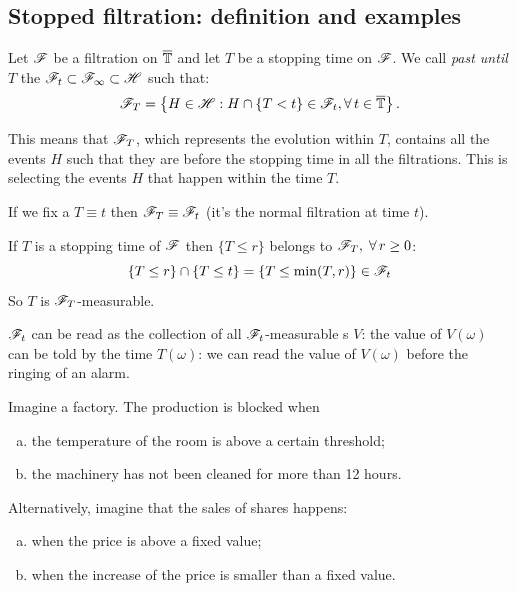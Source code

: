 \documentclass{report}
\begin{document}
\subsection{Stopped filtration: definition and examples}
\begin{definition}
	Let $\mathscr{F}$ be a filtration on $\overline{\mathbb{T}}$ and let $T$ be a stopping time on $\mathscr{F}$. We call \emph{past until $T$} the \sa{} $\mathscr{F}_t\subset\mathscr{F}_\infty\subset\mathscr{H}$ such that:
	\[\mathscr{F}_T=\left\{H\in\mathscr{H}:H\cap\{T<t\}\in\mathscr{F}_t,\forall\, t\in\overline{\mathbb{T}}\right\}.\]
\end{definition}
This means that $\mathscr{F}_T$, which represents the evolution within $T$, contains all the events $H$ such that they are before the stopping time in all the filtrations. This is selecting the events $H$ that happen within the time $T$.
\begin{remark}
	If we fix a $T\equiv t$ then $\mathscr{F}_T\equiv\mathscr{F}_t$ (it's the normal filtration at time $t$).
\end{remark}
If $T$ is a stopping time of $\mathscr{F}$ then $\{T\leq r\}$ belongs to $\mathscr{F}_T,\;\forall\, r\geq 0$:
\[\{T\leq r\}\cap\{T\leq t\}=\{T\leq\min(T,r)\}\in\mathscr{F}_t\]
So $T$ is $\mathscr{F}_T$-measurable. 
\begin{remark}
	$\mathscr{F}_t$ can be read as the collection of all $\mathscr{F}_t$-measurable \rv{}s $V$: the value of $V(\omega)$ can be told by the time $T(\omega)$: we can read the value of $V(\omega)$ before the ringing of an alarm.
\end{remark}
Imagine a factory. The production is blocked when
\begin{enumerate}[a)]
	\item the temperature of the room is above a certain threshold; 
	\item the machinery has not been cleaned for more than 12 hours.
\end{enumerate}\par
Alternatively, imagine that the sales of shares happens:
\begin{enumerate}[a)]
	\item when the price is above a fixed value;
	\item when the increase of the price is smaller than a fixed value.
\end{enumerate}
\end{document}

